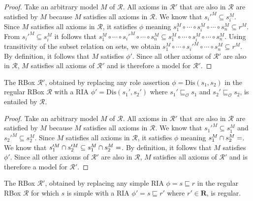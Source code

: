 \begin{proof}
Take an arbitrary model $M$ of $\mathcal{R}$.
All axioms in $\mathcal{R}'$ that are also in $\mathcal{R}$ are satisfied by $M$ because $M$ satisfies all axioms in $\mathcal{R}$.
We know that $s_i'^M \subseteq s_i^M$.
Since $M$ satisfies all axioms in $\mathcal{R}$, it satisfies $\phi$ meaning $s_1^M \circ \cdots \circ s_i^M \circ \cdots \circ s_n^M \subseteq r^M$.
From $s_i'^M \subseteq s_i^M$ it follows that $s_1^M \circ \cdots \circ s_i'^M \circ \cdots \circ s_n^M \subseteq s_1^M \circ \cdots \circ s_i^M \circ \cdots \circ s_n^M$.
Using transitivity of the subset relation on sets, we obtain $s_1^M \circ \cdots \circ s_i'^M \circ \cdots \circ s_n^M \subseteq r^M$.
By definition, it follows that $M$ satisfies $\phi'$.
Since all other axioms of $\mathcal{R}'$ are also in $\mathcal{R}$, $M$ satisfies all axioms of $\mathcal{R}'$ and is therefore a model for $\mathcal{R}'$.
\end{proof}

\begin{lemma} \label{lem:entailed-dis}
The RBox $\mathcal{R}'$, obtained by replacing any role assertion $\phi = \mathrm{Dis}(s_1, s_2)$ in the regular RBox $\mathcal{R}$ with a RIA $\phi' = \mathrm{Dis}(s_1', s_2')$ where $s_1' \sqsubseteq_\mathcal{O} s_1$ and $s_2' \sqsubseteq_\mathcal{O} s_2$, is entailed by $\mathcal{R}$.
\end{lemma}

\begin{proof}
Take an arbitrary model $M$ of $\mathcal{R}$.
All axioms in $\mathcal{R}'$ that are also in $\mathcal{R}$ are satisfied by $M$ because $M$ satisfies all axioms in $\mathcal{R}$.
We know that $s_1'^M \subseteq s_1^M$ and $s_2'^M \subseteq s_2^M$.
Since $M$ satisfies all axioms in $\mathcal{R}$, it satisfies $\phi$ meaning $s_1^M \cap s_2^M = \empty$.
We know that $s_1'^M \cap s_2'^M \subseteq s_1^M \cap s_2^M = \empty$.
By definition, it follows that $M$ satisfies $\phi'$.
Since all other axioms of $\mathcal{R}'$ are also in $\mathcal{R}$, $M$ satisfies all axioms of $\mathcal{R}'$ and is therefore a model for $\mathcal{R}'$.
\end{proof}

\begin{lemma} \label{lem:regular-right}
The RBox $\mathcal{R}'$, obtained by replacing any simple RIA $\phi = s \sqsubseteq r$ in the regular RBox $\mathcal{R}$ for which $s$ is simple with a RIA $\phi' = s \sqsubseteq r'$ where $r' \in \mathbf{R}$, is regular.
\end{lemma}

